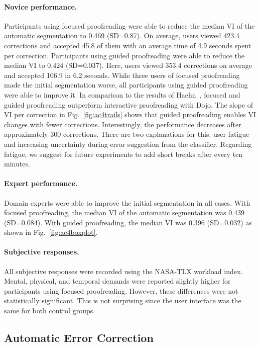 \paragraph{Novice performance.} Participants using focused proofreading were able to reduce the median VI of the automatic segmentation to 0.469 (SD=0.87). On average, users viewed 423.4 corrections and accepted 45.8 of them with an average time of 4.9 seconds spent per correction. Participants using guided proofreading were able to reduce the median VI to 0.424 (SD=0.037). Here, users viewed 353.4 corrections on average and accepted 106.9 in 6.2 seconds. While three users of focused proofreading made the initial segmentation worse, all participants using guided proofreading were able to improve it. In comparison to the results of Haehn~\etal, focused and guided proofreading outperform interactive proofreading with Dojo. The slope of VI per correction in Fig.~\ref{fig:ac4trails} shows that guided proofreading enables VI changes with fewer corrections. Interestingly, the performance decreases after approximately 300 corrections. There are two explanations for this: user fatigue and increasing uncertainty during error suggestion from the classifier. Regarding fatigue, we suggest for future experiments to add short breaks after every ten minutes.

\paragraph{Expert performance.} Domain experts were able to improve the initial segmentation in all cases. With focused proofreading, the median VI of the automatic segmentation was 0.439 (SD=0.084). With guided proofreading, the median VI was 0.396 (SD=0.032) as shown in Fig.~\ref{fig:ac4boxplot}.

\paragraph{Subjective responses.} All subjective responses were recorded using the NASA-TLX workload index. Mental, physical, and temporal demands were reported slightly higher for participants using focused proofreading. However, these differences were not statistically significant. This is not surprising since the user interface was the same for both control groups.

\subsection{Automatic Error Correction}

